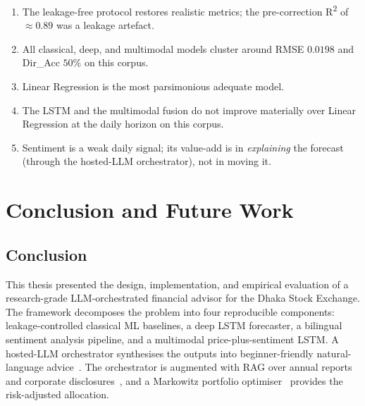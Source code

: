\documentclass[12pt,a4paper,oneside]{report}
\begin{document}
\begin{enumerate}[leftmargin=*,itemsep=2pt]
  \item The leakage-free protocol restores realistic metrics; the
        pre-correction \texorpdfstring{R\textsuperscript{2}}{R²}
        of $\approx 0.89$ was a leakage artefact.
  \item All classical, deep, and multimodal models cluster around
        \ac{RMSE} $0.0198$ and Dir\_Acc $50\%$ on this corpus.
  \item Linear Regression is the most parsimonious adequate model.
  \item The \ac{LSTM} and the multimodal fusion do not improve
        materially over Linear Regression at the daily horizon on
        this corpus.
  \item Sentiment is a weak daily signal; its value-add is in
        \emph{explaining} the forecast (through the hosted-\ac{LLM}
        orchestrator), not in moving it.
\end{enumerate}

\chapter{Conclusion and Future Work}
\label{ch:conclusion}

\section{Conclusion}

This thesis presented the design, implementation, and empirical
evaluation of a research-grade \ac{LLM}-orchestrated financial
advisor for the Dhaka Stock Exchange. The framework decomposes the
problem into four reproducible components: leakage-controlled
classical \ac{ML} baselines, a deep \ac{LSTM} forecaster, a
bilingual sentiment analysis pipeline, and a multimodal
price-plus-sentiment \ac{LSTM}. A hosted-\ac{LLM} orchestrator
synthesises the outputs into beginner-friendly natural-language
advice~\cite{li2024llmfactor,wu2023autogen}. The orchestrator is
augmented with \ac{RAG} over annual reports and corporate
disclosures~\cite{lewis2020rag}, and a Markowitz portfolio
optimiser~\cite{markowitz1952portfolio} provides the
risk-adjusted allocation.
\end{document}

